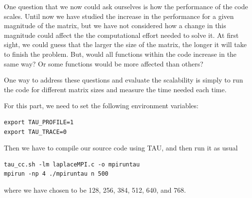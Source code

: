 One question that we now could ask ourselves is how the performance of the code scales. Until now we have studied the increase in the performance for a given magnitude of the matrix, but we have not considered how a change in this magnitude could affect the the computational effort needed to solve it. At first sight, we could guess that the larger the size of the matrix, the longer it will take to finish the problem. But, would all functions within the code increase in the same way? Or some functions would be more affected than others?

One way to address these questions and evaluate the scalability is simply to run the code for different matrix sizes and measure the time needed each time.

For this part, we need to set the following environment variables:
\begin{lstlisting}
export TAU_PROFILE=1
export TAU_TRACE=0
\end{lstlisting}

Then we have to compile our source code using TAU, and then run it as usual
\begin{lstlisting}
tau_cc.sh -lm laplaceMPI.c -o mpiruntau
mpirun -np 4 ./mpiruntau n 500
\end{lstlisting}
where we have chosen  to be 128, 256, 384, 512, 640, and 768.

\begin{table}[H]
    \centering
    \caption{Run time (in ms) obtained on 4 threads for different problem sizes}
    \label{tab:paraprof-sizes}
\end{table}

